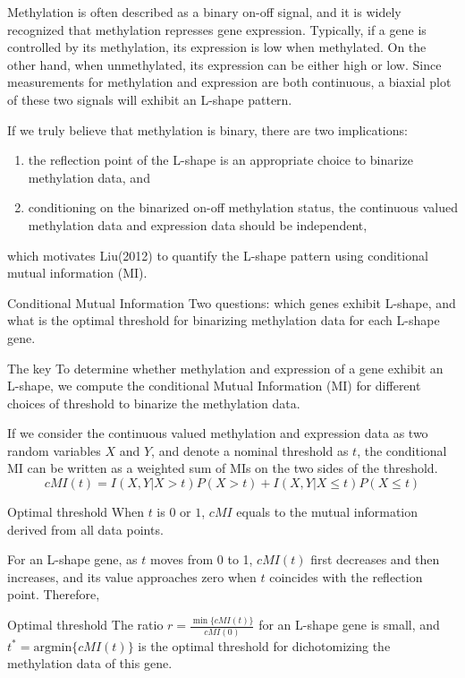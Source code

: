 \documentclass[handout]{beamer}
\begin{document}
\begin{frame}{}
Methylation is often described as a binary on-off signal,
and it is widely recognized that methylation represses gene
expression. Typically, if a gene is controlled by its methylation,
its expression is low when methylated. 
On the other hand,
when unmethylated, its expression can be either high or low.
Since measurements for methylation and expression are both
continuous, a biaxial plot of these two signals will exhibit an
L-shape pattern. 

If we truly
believe that methylation is binary, there are two implications:
\begin{enumerate}
\item the reflection point of the L-shape is an appropriate choice
to binarize methylation data, and
\item conditioning on the
binarized on-off methylation status, the continuous valued
methylation data and expression data should be independent,
\end{enumerate}
which motivates Liu(2012) to quantify the L-shape pattern using
conditional mutual information (MI). 


\end{frame}

\begin{frame}{Conditional Mutual Information}
Two questions: which genes exhibit
L-shape, and what is the optimal threshold for binarizing
methylation data for each L-shape gene.
\begin{block}{The key}
To determine whether methylation and expression of a gene exhibit an L-shape,
we compute the conditional Mutual Information (MI) for different choices of threshold
to binarize the methylation data.
\end{block}
If we consider the continuous valued methylation and expression data as two random variables
$X$ and $Y$, and denote a nominal threshold as $t$, the conditional MI can be written as a
weighted sum of MIs on the two sides of the threshold.
\[
\mathit{cMI}(t)=I(X,Y|X>t)P(X>t) + I(X,Y|X\le t)P(X\le t)
\]
\end{frame}

\begin{frame}{Optimal threshold}
When $t$ is $0$ or $1$, $\mathit{cMI}$ equals to the mutual information derived 
from all data points.

For an L-shape gene, as $t$ moves from 0 to 1, $\mathit{cMI}(t)$ first decreases and then
increases, and its value approaches zero when $t$ coincides with the reflection point. 
Therefore,
\begin{block}{Optimal threshold}
The ratio $r=\frac{\min\{\mathit{cMI}(t)\}}{\mathit{cMI}(0)}$ for an L-shape gene is small, 
and $t^{\ast} = \mathrm{argmin}\{ \mathit{cMI}(t) \}$ is the optimal threshold for 
dichotomizing the methylation data of this gene.
\end{block}

\end{frame}
\end{document}
